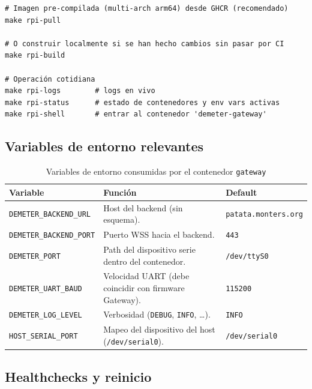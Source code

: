 \begin{lstlisting}[style=trama, caption={Arranque del stack en la Raspberry Pi}]
# Imagen pre-compilada (multi-arch arm64) desde GHCR (recomendado)
make rpi-pull

# O construir localmente si se han hecho cambios sin pasar por CI
make rpi-build

# Operación cotidiana
make rpi-logs        # logs en vivo
make rpi-status      # estado de contenedores y env vars activas
make rpi-shell       # entrar al contenedor 'demeter-gateway'
\end{lstlisting}

\subsection{Variables de entorno relevantes}

\begin{table}[H]
    \centering
    \caption{Variables de entorno consumidas por el contenedor \texttt{gateway}}
    \begin{tabularx}{\textwidth}{lXl}
        \toprule
        \textbf{Variable}              & \textbf{Función}                                       & \textbf{Default} \\
        \midrule
        \texttt{DEMETER\_BACKEND\_URL} & Host del backend (sin esquema).                        & \texttt{patata.monters.org} \\
        \texttt{DEMETER\_BACKEND\_PORT}& Puerto WSS hacia el backend.                          & \texttt{443} \\
        \texttt{DEMETER\_PORT}         & Path del dispositivo serie dentro del contenedor.     & \texttt{/dev/ttyS0} \\
        \texttt{DEMETER\_UART\_BAUD}   & Velocidad UART (debe coincidir con firmware Gateway). & \texttt{115200} \\
        \texttt{DEMETER\_LOG\_LEVEL}   & Verbosidad (\texttt{DEBUG}, \texttt{INFO}, \dots).    & \texttt{INFO} \\
        \texttt{HOST\_SERIAL\_PORT}    & Mapeo del dispositivo del host (\texttt{/dev/serial0}). & \texttt{/dev/serial0} \\
        \bottomrule
    \end{tabularx}
    \label{tab:env_rpi}
\end{table}

\subsection{Healthchecks y reinicio}

